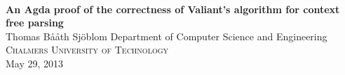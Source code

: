 \begin{titlepage}
  \begin{center}
    \HRule \\[0.4cm]
    {\huge \bfseries An Agda proof of the correctness of Valiant's algorithm for context free parsing }
    \HRule \\[1.5cm]

    Thomas Bååth Sjöblom
    \vfill
        {\large Department of Computer Science and Engineering\\ 
          \textsc{Chalmers University of Technology}\\
          May 29, 2013}
  \end{center}
\end{titlepage}
